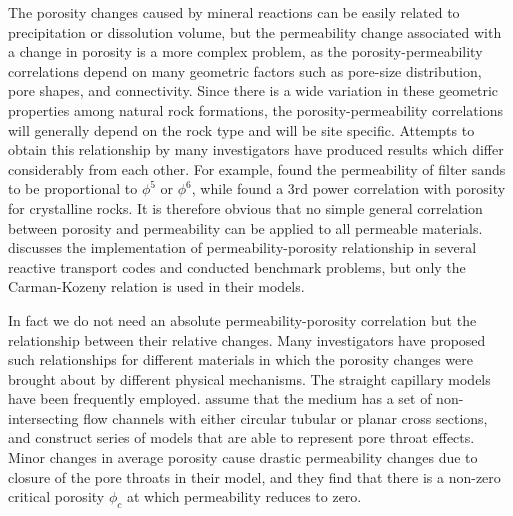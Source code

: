 \documentclass[preprint,12pt,authoryear]{elsarticle}
\begin{document}
The porosity changes caused by mineral reactions can be easily related to precipitation or dissolution volume, but the permeability change associated with a change in porosity is a more complex problem, as the porosity-permeability correlations depend on many geometric factors such as pore-size distribution, pore shapes, and connectivity. Since there is a wide variation in these geometric properties among natural rock formations, the porosity-permeability correlations will generally depend on the rock type and will be site specific. Attempts to obtain this relationship by many investigators have produced results which differ considerably from each other. For example, \cite{mavis1937filter} found the permeability of filter sands to be proportional to $\phi^5$ or $\phi^6$, while \cite{brace1977permeability} found a 3rd power correlation with porosity for crystalline rocks. It is therefore obvious that no simple general correlation between porosity and permeability can be applied to all permeable materials. \cite{xie2014implementation} discusses the implementation of permeability-porosity relationship in several reactive transport codes and conducted benchmark problems, but only the Carman-Kozeny relation is used in their models.

In fact we do not need an absolute permeability-porosity correlation but the relationship between their relative changes. Many investigators have proposed such relationships for different materials in which the porosity changes were brought about by different physical mechanisms. The straight capillary models have been frequently employed. \cite{verma1988thermohydrological} assume that the medium has a set of non-intersecting flow channels with either circular tubular or planar cross sections, and construct series of models that are able to represent pore throat effects. Minor changes in average porosity cause drastic permeability changes due to closure of the pore throats in their model, and they find that there is a non-zero critical porosity $\phi_c$ at which permeability reduces to zero.
\end{document}
